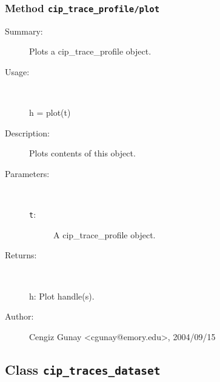 \subsubsection[Method \texttt{plot}]{Method \texttt{cip\_trace\_profile/plot}}%
%
\label{ref_cip_trace_profile__plot}%
\hypertarget{ref_cip_trace_profile__plot}{}%
\begin{description}
\item[Summary:]Plots a cip\_trace\_profile object.
%
\item[Usage:]~%
\begin{lyxcode}%
h = plot(t)
%
\end{lyxcode}%
%
\item[Description:]%
Plots contents of this object.
\item[Parameters:]~
\begin{description}%
\item[\texttt{t}:]
 A cip\_trace\_profile object.
\end{description}%
%
\item[Returns:]~

	h: Plot handle(s).
%
%
%
\item[Author:]%
Cengiz Gunay <cgunay@emory.edu>, 2004/09/15%
\end{description}
\methodline%
\subsection{Class \texttt{cip\_traces\_dataset}}%
%
\label{ref_cip_traces_dataset}%
\hypertarget{ref_cip_traces_dataset}{}%
